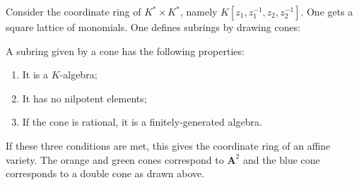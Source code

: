 \documentclass [11 pt, oneside] {article}
\begin{document}
\begin{example}\label{}
Consider the coordinate ring of $K^*\times K^*$, namely $K[z_1,z_1^{-1},z_2,z_2^{-1}]$. One gets a square lattice of monomials. One defines subrings by drawing cones:
\begin{center}
\end{center}
A subring given by a cone has the following properties:
\begin{enumerate}
	\item It is a $K$-algebra;
	\item It has no nilpotent elements;
	\item If the cone is rational, it is a finitely-generated algebra.
\end{enumerate}
If these three conditions are met, this gives the coordinate ring of an affine variety. The orange and green cones correspond to $\mathbf{A}^2$ and the blue cone corresponds to a double cone as drawn above. 


\end{example}
\end{document}
